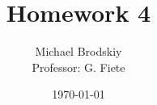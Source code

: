 


\title{Homework 4}
\date{\today}
\author{Michael Brodskiy\\ \small Professor: G. Fiete}



\maketitle

